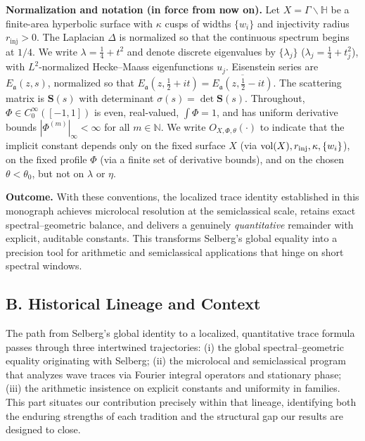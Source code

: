 \medskip

\noindent\textbf{Normalization and notation (in force from now on).}
Let $X=\Gamma\backslash\mathbb{H}$ be a finite-area hyperbolic surface with $\kappa$
cusps of widths $\{w_i\}$ and injectivity radius $r_{\mathrm{inj}}>0$.
The Laplacian $\Delta$ is normalized so that the continuous spectrum begins at $1/4$.
We write $\lambda=\frac14+t^2$ and denote discrete eigenvalues by $\{\lambda_j\}$
($\lambda_j=\tfrac14+t_j^2$), with $L^2$-normalized Hecke–Maass eigenfunctions $u_j$.
Eisenstein series are $E_\mathfrak{a}(z,s)$, normalized so that
$E_\mathfrak{a}(z,\tfrac12+it)=\overline{E_\mathfrak{a}(z,\tfrac12-it)}$.
The scattering matrix is $\mathbf{S}(s)$ with determinant $\sigma(s)=\det\mathbf{S}(s)$.
Throughout, $\Phi\in C_0^\infty([-1,1])$ is even, real-valued, $\int\Phi=1$, and
has uniform derivative bounds $|\Phi^{(m)}|_\infty<\infty$ for all $m\in\mathbb{N}$.
We write $O_{X,\Phi,\theta}(\cdot)$ to indicate that the implicit constant depends
only on the fixed surface $X$ (via $\operatorname{vol}(X), r_{\mathrm{inj}}, \kappa, \{w_i\}$),
on the fixed profile $\Phi$ (via a finite set of derivative bounds),
and on the chosen $\theta<\theta_0$, but not on $\lambda$ or $\eta$.

\medskip

\noindent\textbf{Outcome.}
With these conventions, the localized trace identity established in this monograph
achieves microlocal resolution at the semiclassical scale, retains exact spectral–geometric
balance, and delivers a genuinely \emph{quantitative} remainder with explicit,
auditable constants. This transforms Selberg’s global equality into a precision tool
for arithmetic and semiclassical applications that hinge on short spectral windows.


\subsection*{B. Historical Lineage and Context}

The path from Selberg’s global identity to a localized, quantitative trace formula
passes through three intertwined trajectories: (i) the global spectral–geometric
equality originating with Selberg; (ii) the microlocal and semiclassical program
that analyzes wave traces via Fourier integral operators and stationary phase;
(iii) the arithmetic insistence on explicit constants and uniformity in families.
This part situates our contribution precisely within that lineage, identifying both
the enduring strengths of each tradition and the structural gap our results are
designed to close.

